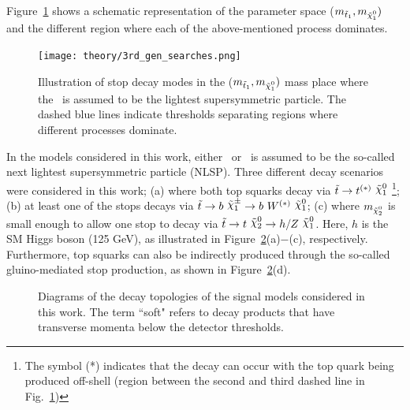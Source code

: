 				\noindent Figure~\ref{fig:stop_topologies} shows a schematic representation of the parameter space ($m_{\stopone}, m_{\ninoone})$ and the different region where each of the above-mentioned process dominates. %

				\begin{figure}[!htb]
					\centering
					\texttt{[image: theory/3rd\_gen\_searches.png]}
					\caption{\label{fig:stop_topologies} Illustration of stop decay modes in the ($m_{\stopone}, m_{\ninoone})$ mass place where the \ninoone\ is assumed to be the lightest supersymmetric particle. The dashed blue lines indicate thresholds separating regions where different processes dominate.}
				\end{figure}

				In the models considered in this work, either \ninotwo\ or \chinoonepm\ is assumed to be the so-called next lightest supersymmetric particle (NLSP). Three different decay scenarios were considered in this work; (a) where both top squarks decay via $\stop\rightarrow t^{(*)}\ \ninoone$ \footnote{The symbol (*) indicates that the decay can occur with the top quark being produced off-shell (region between the second and third dashed line in Fig.~\ref{fig:stop_topologies})}; (b) at least one of the stops decays via $\stop\rightarrow b\ \chinoonepm \rightarrow b\ \Wboson^{(*)}\ \ninoone$; (c) where $m_{\ninotwo}$ is small enough to allow one stop to decay via $\stop\to t\ \ninotwo \to h/Z\ \ninoone$. Here, $h$ is the SM Higgs boson (125 GeV), as illustrated in 
				Figure~\ref{fig:feynDiagModels}(a)$-$(c), respectively. Furthermore, top squarks can also be indirectly produced through the so-called gluino-mediated stop production, as shown in Figure~\ref{fig:feynDiagModels}(d). 				


				\begin{figure}[!htb]
					\begin{center}
						\hspace{0.05\textwidth}
						\hspace{0.05\textwidth}
						\hspace{0.05\textwidth}
						\hspace{0.05\textwidth}
					\end{center}
					\caption{Diagrams of the decay topologies of the signal models considered in this work. The term ``soft" refers to decay products that have transverse momenta below the detector thresholds.}
					\label{fig:feynDiagModels}
				\end{figure}
